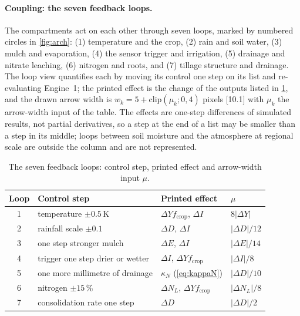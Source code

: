 \paragraph{Coupling: the seven feedback loops.}
\label{sec:sys-loops}
The compartments act on each other through seven loops, marked by numbered circles in \cref{fig:arch}: (1) temperature and the crop, (2) rain and soil water, (3) mulch and evaporation, (4) the sensor trigger and irrigation, (5) drainage and nitrate leaching, (6) nitrogen and roots, and (7) tillage structure and drainage. The loop view quantifies each by moving its control one step on its list and re-evaluating Engine~1; the printed effect is the change of the outputs listed in \cref{tab:loops}, and the drawn arrow width is $w_k=5+\mathrm{clip}(\mu_k;0,4)$ pixels [10.1] with $\mu_k$ the arrow-width input of the table. The effects are one-step differences of simulated results, not partial derivatives, so a step at the end of a list may be smaller than a step in its middle; loops between soil moisture and the atmosphere at regional scale \citep{Entekhabi1996,Koster2004,Seneviratne2010} are outside the column and are not represented.

\begin{table}[H]\centering\small
\caption{The seven feedback loops: control step, printed effect and arrow-width input $\mu$.}
\label{tab:loops}
\begin{tabular}{clll}
\toprule
Loop & Control step & Printed effect & $\mu$\\\midrule
1 & temperature $\pm0.5$\,K & $\Delta Y f_{\mathrm{crop}}$, $\Delta I$ & $8|\Delta Y|$\\
2 & rainfall scale $\pm0.1$ & $\Delta D$, $\Delta I$ & $|\Delta D|/12$\\
3 & one step stronger mulch & $\Delta E$, $\Delta I$ & $|\Delta E|/14$\\
4 & trigger one step drier or wetter & $\Delta I$, $\Delta Y f_{\mathrm{crop}}$ & $|\Delta I|/8$\\
5 & one more millimetre of drainage & $\kappa_N$ (\cref{eq:kappaN}) & $|\Delta D|/10$\\
6 & nitrogen $\pm15$\,\% & $\Delta N_L$, $\Delta Y f_{\mathrm{crop}}$ & $|\Delta N_L|/8$\\
7 & consolidation rate one step & $\Delta D$ & $|\Delta D|/2$\\\bottomrule
\end{tabular}
\end{table}

